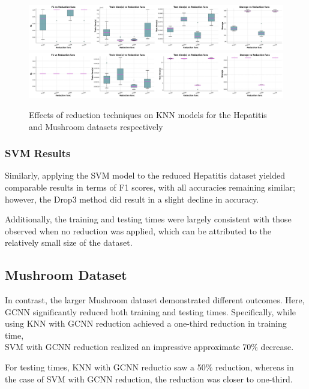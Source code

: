 \begin{figure}
    \centering
    \includegraphics[width=\textwidth]{figures/KNN_reduction_effects_hepatitis.png}
    \includegraphics[width=\textwidth]{figures/KNN_reduction_effects_mushroom.png}
    \caption{Effects of reduction techniques on KNN models for the Hepatitis and Mushroom datasets respectively}
    \label{fig:KNN-reduction-effects}
\end{figure}

\subsubsection*{SVM Results}

Similarly, applying the SVM model to the reduced Hepatitis dataset yielded comparable results in terms of F1 scores,
with all accuracies remaining similar; however, the Drop3 method did result in a slight decline in accuracy.

Additionally, the training and testing times were largely consistent with those observed when no reduction was applied,
which can be attributed to the relatively small size of the dataset.

\subsection*{Mushroom Dataset}
In contrast, the larger Mushroom dataset demonstrated different outcomes.
Here, GCNN significantly reduced both training and testing times. 
Specifically, while using KNN with GCNN reduction achieved a one-third reduction in training time,\\
SVM with GCNN reduction realized an impressive approximate 70\% decrease. 

For testing times, KNN with GCNN reductio saw a 50\% reduction, whereas in the case of SVM with GCNN reduction, the reduction was closer to one-third.

